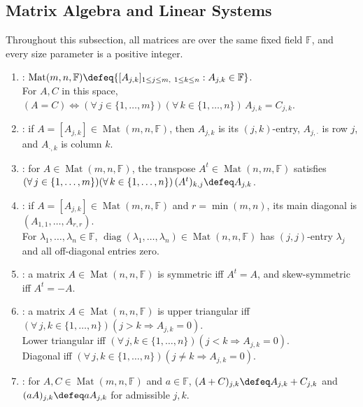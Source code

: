 \subsection{Matrix Algebra and Linear Systems}
Throughout this subsection, all matrices are over the same fixed field $\mathbb{F}$, and every size parameter is a positive integer.

\begin{definition} \label{def:matrices-and-matrix-operations} 
\begin{enumerate}[label=(\roman*)]
\setlength{\itemsep}{0pt}
\item {}: $\operatorname{Mat}(m,n,\mathbb{F})\defeq\{[A_{j,k}]_{1\leq j\leq m,\ 1\leq k\leq n}:A_{j,k}\in\mathbb{F}\}$.\\
For $A,C$ in this space, $(A=C)\iff(\forall\,j\in\{1,\ldots,m\})(\forall\,k\in\{1,\ldots,n\})\,A_{j,k}=C_{j,k}$.
\item {}: if $A=[A_{j,k}]\in\operatorname{Mat}(m,n,\mathbb{F})$, then $A_{j,k}$ is its $(j,k)$-entry, $A_{j,\cdot}$ is row $j$, and $A_{\cdot,k}$ is column $k$.
\item {}: for $A\in\operatorname{Mat}(m,n,\mathbb{F})$, the transpose $A^t\in\operatorname{Mat}(n,m,\mathbb{F})$ satisfies $(\forall\,j\in\{1,\ldots,m\})(\forall\,k\in\{1,\ldots,n\})\,(A^t)_{k,j}\defeq A_{j,k}$.
\item {}: if $A=[A_{j,k}]\in\operatorname{Mat}(m,n,\mathbb{F})$ and $r=\min(m,n)$, its main diagonal is $(A_{1,1},\ldots,A_{r,r})$.\\
For $\lambda_1,\ldots,\lambda_n\in\mathbb{F}$, $\operatorname{diag}(\lambda_1,\ldots,\lambda_n)\in\operatorname{Mat}(n,n,\mathbb{F})$ has $(j,j)$-entry $\lambda_j$ and all off-diagonal entries zero.
\item {}: a matrix $A\in\operatorname{Mat}(n,n,\mathbb{F})$ is symmetric iff $A^t=A$, and skew-symmetric iff $A^t=-A$.
\item {}: a matrix $A\in\operatorname{Mat}(n,n,\mathbb{F})$ is upper triangular iff $(\forall\,j,k\in\{1,\ldots,n\})(j>k\Rightarrow A_{j,k}=0)$.\\
Lower triangular iff $(\forall\,j,k\in\{1,\ldots,n\})(j<k\Rightarrow A_{j,k}=0)$.\\
Diagonal iff $(\forall\,j,k\in\{1,\ldots,n\})(j\neq k\Rightarrow A_{j,k}=0)$.
\item {}: for $A,C\in\operatorname{Mat}(m,n,\mathbb{F})$ and $a\in\mathbb{F}$, $(A+C)_{j,k}\defeq A_{j,k}+C_{j,k}$ and $(aA)_{j,k}\defeq aA_{j,k}$ for admissible $j,k$.

\end{enumerate}
\end{definition}
